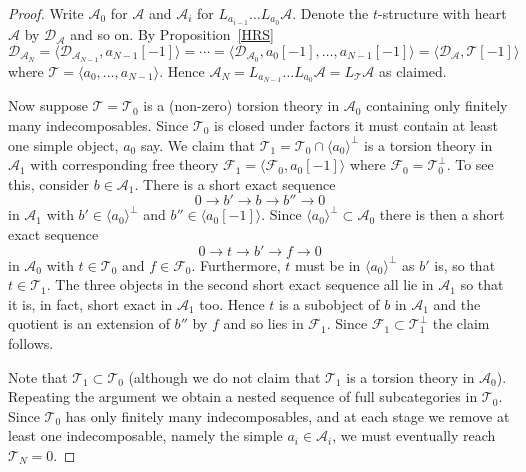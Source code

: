 \documentclass{article}
\theoremstyle{plain}
\theoremstyle{definition}
\theoremstyle{remark}
\newcommand{\cat}[1]{\mathcal{#1}}
\begin{document}
\begin{proof}
Write  $\cat{A}_0$ for $\cat{A}$ and $\cat{A}_i$ for $L_{a_{i-1}}\ldots L_{a_0}\cat{A}$. Denote the $t$-structure with heart $\cat{A}$ by $\cat{D}_\cat{A}$ and so on. By Proposition~\ref{HRS}
$$
\cat{D}_{\cat{A}_N} = \langle \cat{D}_{\cat{A}_{N-1}} , a_{N-1}[-1] \rangle= \cdots
= \langle \cat{D}_{\cat{A}_0}, a_0[-1],\ldots,a_{N-1}[-1] \rangle = \langle \cat{D}_\cat{A} , \cat{T}[-1] \rangle
$$
where $\cat{T} = \langle a_0,\ldots,a_{N-1}\rangle$. Hence $\cat{A}_N=L_{a_{N-1}}\ldots L_{a_0}\cat{A}=L_\cat{T}\cat{A}$ as claimed. 

Now suppose $\cat{T}=\cat{T}_0$ is a (non-zero) torsion theory in $\cat{A}_0$ containing only finitely many indecomposables. Since $\cat{T}_0$ is closed under factors it must contain at least one simple object, $a_0$ say. We claim that $\cat{T}_1 = \cat{T}_0 \cap \langle a_0\rangle^\perp$ is a torsion theory in $\cat{A}_1$ with corresponding free theory $\cat{F}_1 = \langle \cat{F}_0, a_0[-1]\rangle$ where $\cat{F}_0=\cat{T}_0^\perp$. To see this, consider $b\in \cat{A}_1$. There is a short exact sequence
$$
0\to b' \to b \to b'' \to 0
$$
in $\cat{A}_1$ with $b' \in \langle a_0\rangle^\perp$ and $b'' \in \langle a_0[-1]\rangle$. Since $ \langle a_0\rangle^\perp \subset \cat{A}_0$  there is then a short exact sequence
$$
0 \to t \to b' \to f \to 0
$$
in $\cat{A}_0$ with $t\in \cat{T}_0$ and $f\in \cat{F}_0$. Furthermore, $t$ must be in $\langle a_0\rangle^\perp$ as $b'$ is, so that $t\in \cat{T}_1$. The three objects in the second short exact sequence all lie in $\cat{A}_1$ so that it is, in fact, short exact in $\cat{A}_1$ too. Hence $t$ is a subobject of $b$ in $\cat{A}_1$ and the quotient is an extension of $b''$ by $f$ and so lies in $\cat{F}_1$. Since $\cat{F}_1 \subset \cat{T}_1^\perp$ the claim follows. 

Note that $\cat{T}_1 \subset \cat{T}_0$ (although we do not claim that $\cat{T}_1$ is a torsion theory in $\cat{A}_0$).  Repeating the argument we obtain a nested sequence of full subcategories in $\cat{T}_0$. Since $\cat{T}_0$ has only finitely many indecomposables, and at each stage we remove at least one indecomposable, namely the simple $a_i \in \cat{A}_i$, we must eventually reach $\cat{T}_N=0$. 


\end{proof}
\end{document}
